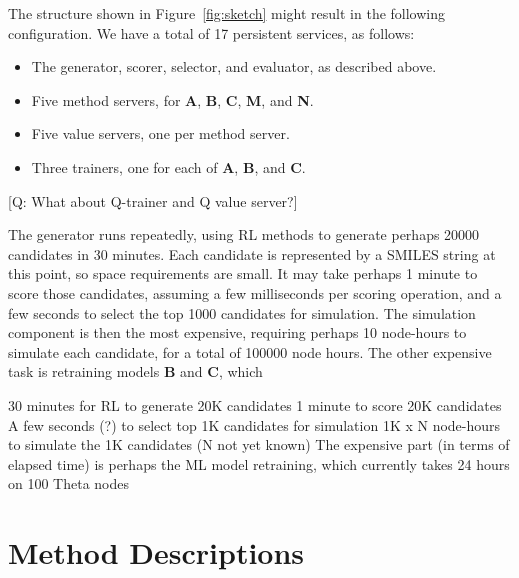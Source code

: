 \documentclass[10pt]{article}
\newcommand\q[1]{{\color{blue}[Q: #1]}}
\begin{document}
The structure shown in Figure~\ref{fig:sketch} might result in the following configuration. 
We have a total of 17 persistent services, as follows:
\begin{itemize}\itemsep-0.2em
\item
The generator, scorer, selector, and evaluator, as described above.
\item
Five method servers, for \textbf{A}, \textbf{B}, \textbf{C}, \textbf{M}, and \textbf{N}.
\item
Five value servers, one per method server.
\item
Three trainers, one for each of \textbf{A}, \textbf{B}, and \textbf{C}.
\end{itemize}

\q{What about Q-trainer and Q value server?}

The generator runs repeatedly, using RL methods to generate perhaps \num{20000} candidates in 30 minutes.
Each candidate is represented by a SMILES string at this point, so space requirements are small.
It may take perhaps 1 minute to score those candidates, assuming a few milliseconds per scoring operation,
and a few seconds to select the top \num{1000} candidates for simulation.
The simulation component is then the most expensive, requiring perhaps 10 node-hours to simulate each candidate,
for a total of \num{100000} node hours.
The other expensive task is retraining models \textbf{B} and \textbf{C}, which 


30 minutes for RL to generate 20K candidates
1 minute to score 20K candidates
A few seconds (?) to select top 1K candidates for simulation
1K x N node-hours to simulate the 1K candidates (N not yet known)
The expensive part (in terms of elapsed time) is perhaps the ML model retraining, which currently takes 24 hours on 100 Theta nodes
 



\section{Method Descriptions}\label{sec:details}
\end{document}
